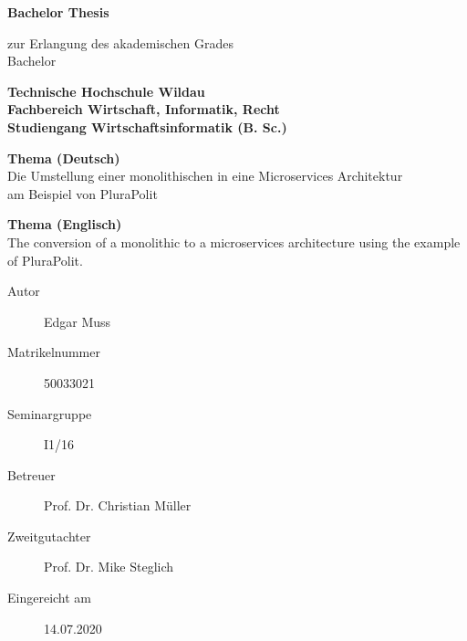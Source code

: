 \begin{titlepage}
\begin{center}

\textbf{\huge
Bachelor Thesis
}
\vspace{1.3cm}
		
zur Erlangung des akademischen Grades \\
Bachelor

\vspace{2cm}

\textbf{ \large
Technische Hochschule Wildau \\
Fachbereich Wirtschaft, Informatik, Recht \\
Studiengang Wirtschaftsinformatik (B. Sc.)
}

\vspace{1.4cm}

\textbf{Thema (Deutsch)} \\
Die Umstellung einer monolithischen in eine Microservices Architektur \\
am Beispiel von PluraPolit

\vspace{.5cm}

\textbf{Thema (Englisch)} \\
The conversion of a monolithic to a microservices architecture using the example of PluraPolit.

\vspace{1.5cm}

		\end{center}
\begin{description}
	\item [Autor] Edgar Muss
	\item [Matrikelnummer] 50033021
	\item [Seminargruppe] I1/16
	\item [Betreuer] Prof. Dr. Christian Müller
	\item [Zweitgutachter] Prof. Dr. Mike Steglich
	\item [Eingereicht am] 14.07.2020
\end{description}
\end{titlepage}